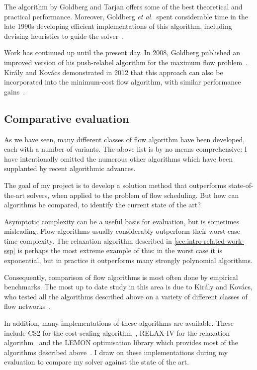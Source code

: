 The algorithm by Goldberg and Tarjan offers some of the best theoretical and practical performance. Moreover, Goldberg \textit{et al.}\ spent considerable time in the late 1990s developing efficient implementations of this algorithm, including devising heuristics to guide the solver~\cite{Goldberg:1997,Bunnagel:1998}.

Work has continued up until the present day. In 2008, Goldberg published an improved version of his push-relabel algorithm for the maximum flow problem~\cite{Goldberg:2008}. Kir{\'{a}}ly and Kov{\'{a}}cs demonstrated in 2012 that this approach can also be incorporated into the minimum-cost flow algorithm, with similar performance gains~\cite{KiralyKovacs:2012}.

\subsection{Comparative evaluation}

As we have seen, many different classes of flow algorithm have been developed, each with a number of variants. The above list is by no means comprehensive: I have intentionally omitted the numerous other algorithms which have been supplanted by recent algorithmic advances.

The goal of my project is to develop a solution method that outperforms state-of-the-art solvers, when applied to the problem of flow scheduling. But how can algorithms be compared, to identify the current state of the art? 

Asymptotic complexity can be a useful basis for evaluation, but is sometimes misleading. Flow algorithms usually considerably outperform their worst-case time complexity. The relaxation algorithm described in \cref{sec:intro-related-work-ssp} is perhaps the most extreme example of this: in the worst case it is exponential, but in practice it outperforms many strongly polynomial algorithms.

Consequently, comparison of flow algorithms is most often done by empirical benchmarks. The most up to date study in this area is due to Kir{\'{a}}ly and Kov{\'{a}}cs, who tested all the algorithms described above on a variety of different classes of flow networks~\cite{KiralyKovacs:2012,Kovacs:2015}.

In addition, many implementations of these algorithms are available. These include CS2 for the cost-scaling algorithm~\cite{CS2:2009}, RELAX-IV for the relaxation algorithm~\cite{RelaxIV:2011} and the LEMON optimisation library which provides most of the algorithms described above~\cite{LEMON:2011,LEMON:Software}. I draw on these implementations during my evaluation to compare my solver against the state of the art.